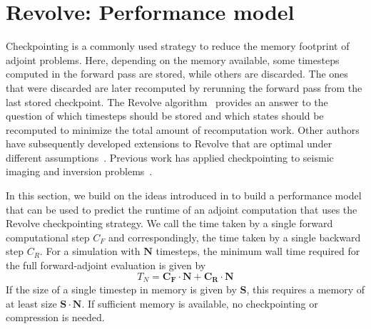 \section{Revolve: Performance model}
\label{sec:revolve}
Checkpointing is a commonly used strategy to reduce the memory footprint
of adjoint problems. Here, depending on the memory available, some timesteps
computed in the forward pass are stored, while others are discarded. The ones
that were discarded are later recomputed by rerunning the forward pass from
the last stored checkpoint. 
The Revolve algorithm~\cite{griewank2000algorithm} provides an
answer to the question of which timesteps should be stored and which
states should be recomputed to minimize the total amount of
recomputation work. Other authors have subsequently developed
extensions to Revolve that are optimal under different
assumptions~\cite{stumm2009multistage,
wang2009minimal,aupy2016optimal,schanen2016asynchronous, aupy2017periodicity}. Previous
work has applied checkpointing to seismic imaging and inversion
problems~\cite{symes2007reverse, datta2018asynchronous}.


In this section, we build on the ideas introduced in \cite{stumm2009multistage} to build a performance model that can be used to predict the runtime of an adjoint computation that uses the Revolve checkpointing strategy. 
We call the time taken by a single forward computational step $C_F$
and correspondingly, the time taken by a single backward step $C_R$. For a simulation with $\mathbf{N}$ timesteps, the minimum wall time required
for the full forward-adjoint evaluation is given by
\begin{equation}
T_N = \mathbf{C_F} \cdot \mathbf{N} + \mathbf{C_R} \cdot \mathbf{N}
\end{equation}
If the size of a single timestep in memory is given by $\mathbf{S}$, this
requires a memory of at least size $\mathbf{S} \cdot \mathbf{N}$. If sufficient memory
is available, no checkpointing or compression is needed.

